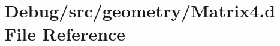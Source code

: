 \hypertarget{_matrix4_8d}{}\section{Debug/src/geometry/\+Matrix4.d File Reference}
\label{_matrix4_8d}
